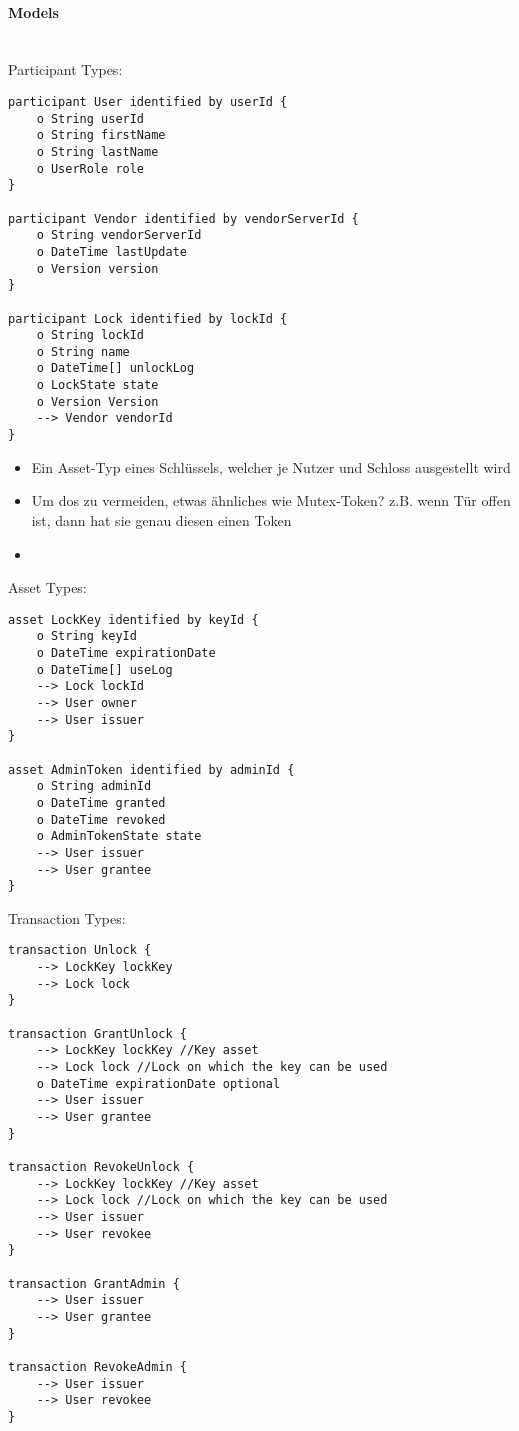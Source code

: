         \paragraph{\textrm{Models}}\hspace{0cm}\smallskip\\
            Participant Types:
            \begin{lstlisting}[caption={Participant Types},label=prototype_pariticipants,captionpos=b]
participant User identified by userId {
    o String userId
    o String firstName
    o String lastName
	o UserRole role
}

participant Vendor identified by vendorServerId {
	o String vendorServerId
	o DateTime lastUpdate
	o Version version
}

participant Lock identified by lockId {
    o String lockId
    o String name
    o DateTime[] unlockLog
	o LockState state
	o Version Version
	--> Vendor vendorId
}
        \end{lstlisting}
            
            \begin{itemize}[noitemsep]
                \item Ein Asset-Typ eines Schlüssels, welcher je Nutzer und Schloss ausgestellt wird
                \item Um \gls{dos} zu vermeiden, etwas ähnliches wie Mutex-Token? z.B. wenn Tür offen ist, dann hat sie genau diesen einen Token
                \item 
            \end{itemize}
            
            Asset Types:
            \begin{lstlisting}[caption={Asset Types},label=prototype_assets,captionpos=b]
asset LockKey identified by keyId {
    o String keyId
    o DateTime expirationDate
    o DateTime[] useLog
    --> Lock lockId
    --> User owner
    --> User issuer
}

asset AdminToken identified by adminId {
	o String adminId
	o DateTime granted
	o DateTime revoked
	o AdminTokenState state
	--> User issuer
    --> User grantee
}
            \end{lstlisting}
        
            Transaction Types:
            \begin{lstlisting}[caption={Relevante Transaktionen},label=prototype_transactions,captionpos=b]
transaction Unlock {
    --> LockKey lockKey
    --> Lock lock
}

transaction GrantUnlock {
    --> LockKey lockKey //Key asset
    --> Lock lock //Lock on which the key can be used
	o DateTime expirationDate optional
    --> User issuer
    --> User grantee
}

transaction RevokeUnlock {
    --> LockKey lockKey //Key asset
    --> Lock lock //Lock on which the key can be used
    --> User issuer
    --> User revokee
}

transaction GrantAdmin {
    --> User issuer
    --> User grantee
}

transaction RevokeAdmin {
    --> User issuer
    --> User revokee
}
            \end{lstlisting}
            
